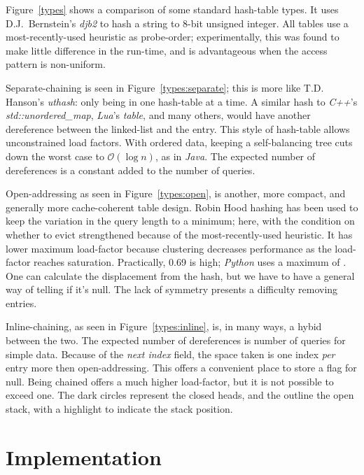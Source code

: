 \documentclass[12pt]{article}
\begin{document}
Figure~\ref{types} shows a comparison of some standard hash-table types. It uses D.J.~Bernstein's {\it djb2} to hash a string to 8-bit unsigned integer. All tables use a most-recently-used heuristic as probe-order; experimentally, this was found to make little difference in the run-time, and is advantageous when the access pattern is non-uniform\cite{brent1973reducing, sleator1985self}.

Separate-chaining is seen in Figure~\ref{types:separate}; this is more like T.D. Hanson's {\it uthash}: only being in one hash-table at a time. A similar hash to {\it C++}'s {\it std::unordered\_map}, {\it Lua}'s {\it table}, and many others, would have another dereference between the linked-list and the entry. This style of hash-table allows unconstrained load factors. With ordered data, keeping a self-balancing tree cuts down the worst case to $\mathcal{O}(\log n)$\cite{knuth1998sorting}, as in {\it Java}. The expected number of dereferences is a constant added to the number of queries.

Open-addressing\cite{peterson1957addressing} as seen in Figure~\ref{types:open}, is another, more compact, and generally more cache-coherent table design. Robin Hood hashing\cite{celis1985robin} has been used to keep the variation in the query length to a minimum; here, with the condition on whether to evict strengthened because of the most-recently-used heuristic. It has lower maximum load-factor because clustering decreases performance as the load-factor reaches saturation\cite{skiena2008algorithm}. Practically, 0.69 is high; {\it Python}\cite{knuth1998sorting} uses a maximum of . One can calculate the displacement from the hash, but we have to have a general way of telling if it's null. The lack of symmetry presents a difficulty removing entries.

Inline-chaining, as seen in Figure~\ref{types:inline}, is, in many ways, a hybid between the two. The expected number of dereferences is number of queries for simple data. Because of the {\it next index} field, the space taken is one index {\it per} entry more then open-addressing. This offers a convenient place to store a flag for null. Being chained offers a much higher load-factor, but it is not possible to exceed one. The dark circles represent the closed heads, and the outline the open stack, with a highlight to indicate the stack position.

\section{Implementation}
\end{document}

